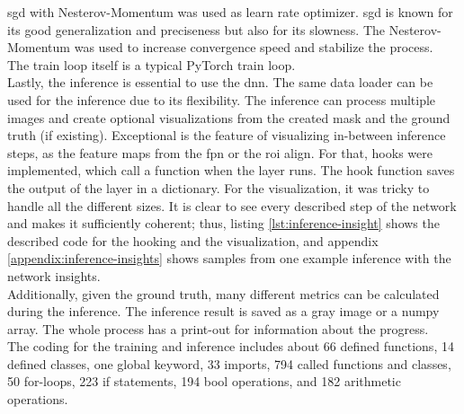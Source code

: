 		\ac{sgd} with Nesterov-Momentum \cite{Botev2016} was used as learn rate optimizer. \ac{sgd} is known for its good generalization and preciseness but also for its slowness. The Nesterov-Momentum was used to increase convergence speed and stabilize the process.\\
		The train loop itself is a typical PyTorch train loop. \\
		\clearpage
		Lastly, the inference is essential to use the \ac{dnn}. The same data loader can be used for the inference due to its flexibility. The inference can process multiple images and create optional visualizations from the created mask and the ground truth (if existing). Exceptional is the feature of visualizing in-between inference steps, as the feature maps from the \ac{fpn} or the \ac{roi} align. For that, hooks were implemented, which call a function when the layer runs. The hook function saves the output of the layer in a dictionary. For the visualization, it was tricky to handle all the different sizes. It is clear to see every described step of the network and makes it sufficiently coherent; thus, listing \ref{lst:inference-insight} shows the described code for the hooking and the visualization, and appendix \ref{appendix:inference-insights} shows samples from one example inference with the network insights.\\
		Additionally, given the ground truth, many different metrics can be calculated during the inference. The inference result is saved as a gray image or a numpy array. The whole process has a print-out for information about the progress.\\
		The coding for the training and inference includes about 66 defined functions, 14 defined classes, one global keyword, 33 imports, 794 called functions and classes, 50 for-loops, 223 if statements, 194 bool operations, and 182 arithmetic operations.
	
	
	
	
